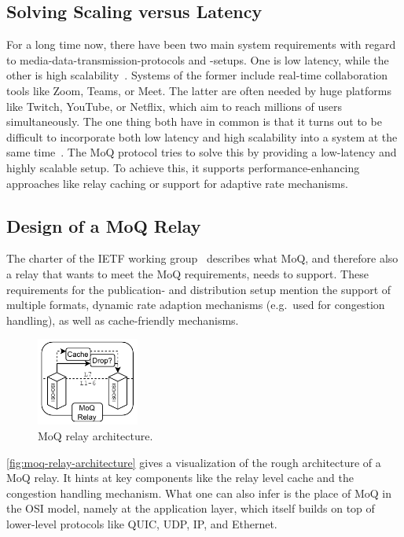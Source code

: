 \subsection{Solving Scaling versus Latency}
For a long time now, there have been two main system requirements with regard to 
media-data-transmission-protocols and -setups.
One is low latency, while the other is high scalability~\parencite{what-is-moq}.
Systems of the former include real-time collaboration tools like Zoom, Teams, or Meet.
The latter are often needed by huge platforms like Twitch, YouTube, or Netflix, which aim to 
reach millions of users simultaneously.
The one thing both have in common is that it turns out to be difficult to incorporate both 
low latency and high scalability into a system at the same time~\parencite{what-is-moq}.
The MoQ protocol tries to solve this by providing a low-latency and
highly scalable setup.
To achieve this, it supports performance-enhancing approaches like relay caching or support 
for adaptive rate mechanisms. %

\subsection{Design of a MoQ Relay}
The charter of the IETF working group~\parencite{moq-charter} describes what MoQ, and therefore also a relay that wants to meet the MoQ requirements, needs to support.
These requirements for the publication- and distribution setup mention the support of 
multiple formats, dynamic rate adaption mechanisms (e.g.~used for congestion handling),
as well as cache-friendly mechanisms.

\begin{figure}[H]
    \centering
    \includegraphics[width=0.3\textwidth]{figures/02_background/moq-relay.drawio.pdf}
    \caption[MoQ relay architecture]{MoQ relay architecture.}\label{fig:moq-relay-architecture}
\end{figure}

\autoref{fig:moq-relay-architecture} gives a visualization of the rough architecture
of a MoQ relay.
It hints at key components like the relay level cache and the congestion handling
mechanism.
What one can also infer is the place of MoQ in the OSI model, namely at the application
layer, which itself builds on top of lower-level protocols like QUIC, UDP, IP, and Ethernet.

